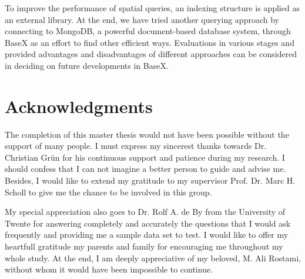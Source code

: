 \documentclass[a4paper,12pt]{article}
\begin{document}
To improve the performance of spatial queries, an indexing structure is applied as an external library.
At the end, we have tried another querying approach by connecting to MongoDB, a powerful document-based database system, through BaseX as an effort to find other efficient ways.
Evaluations in various stages and provided advantages and disadvantages of different approaches can be considered in deciding on future developments in BaseX.
\thispagestyle{empty}

\newpage
\section*{Acknowledgments}
\thispagestyle{empty}

The completion of this master thesis would not have been possible 
without the support of many people. 
I must express my sincerest thanks towards 
Dr. Christian Gr{\"u}n for his continuous support and patience during my research.
I should confess that I can not imagine a better person to guide and advise me. Besides, I would like to extend my gratitude to my supervisor Prof. Dr. Marc H. Scholl to give me the chance to be involved in this group.

My special appreciation also goes to Dr. Rolf A. de By from the University of Twente for
answering completely and accurately the questions that I would ask
frequently and providing me a sample data set to test. I would like to offer my heartfull gratitude my parents and family for encouraging me 
throughout my whole study. At the end, I am deeply appreciative of my beloved, M. Ali Rostami, without whom it would have been impossible to continue.


\newpage
\tableofcontents

\thispagestyle{empty}
\newpage
\end{document}
